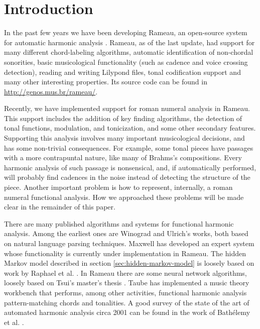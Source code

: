 
\section{Introduction}
\label{sec:introduction}

In the past few years we have been developing Rameau, an open-source
system for automatic harmonic analysis \cite{kroger08:rameau}. Rameau,
as of the last update, had support for many different chord-labeling
algorithms, automatic identification of non-chordal sonorities, basic
musicological functionality (such as cadence and voice crossing
detection), reading and writing Lilypond \cite{nienhuys.ea08:lilypond}
files, tonal codification support and many other interesting
properties. Its source code can be found in
\url{http://genos.mus.br/rameau/}.

Recently, we have implemented support for roman numeral analysis in
Rameau. This support includes the addition of key finding algorithms,
the detection of tonal functions, modulation, and tonicization, and
some other secondary features. Supporting this analysis involves many
important musicological decisions, and has some non-trivial
consequences. For example, some tonal pieces have passages with a more
contrapuntal nature, like many of Brahms's compositions.  Every harmonic analysis of such passage
is nonsensical, and, if automatically performed, will probably find
cadences in the noise instead of detecting the structure of the piece.
Another important problem is how to represent, internally, a roman
numeral functional analysis.  How we
approached these problems will be made clear in the remainder of this
paper.

There are many published algorithms and systems for functional
harmonic analysis. Among the earliest ones are  Winograd
\cite{winograd68:linguistics} and Ulrich's \cite{ulrich77:analysis}
works, both based on natural language parsing techniques. Maxwell
\cite{maxwell92:expert} has developed an expert system whose
functionality is currently under implementation in Rameau. The hidden
Markov model described in section \ref{sec:hidden-markov-model} is
loosely based on work by Raphael et
al. \cite{raphael.ea03:harmonic}. In Rameau there are some neural
network algorithms, loosely based on Tsui's master's thesis
\cite{tsui02:harmonic}. Taube \cite{taube99:automatic} has implemented
a music theory workbench that performs, among other activities,
functional harmonic analysis pattern-matching chords and tonalities. A
good survey of the state of the art of automated harmonic analysis
circa 2001 can be found in the work of Bathélemy et
al. \cite{barthelemy.ea01:figured}.

